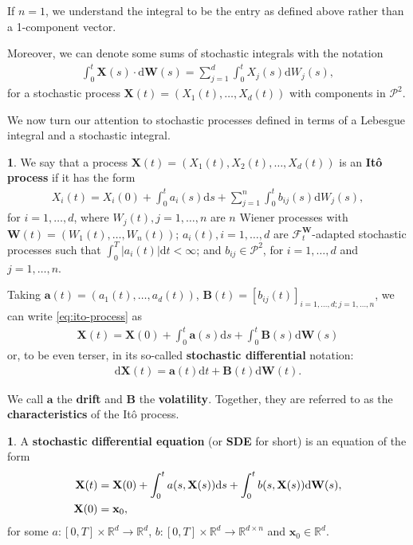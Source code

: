 \documentclass[english]{article}
\numberwithin{equation}{section}
\numberwithin{figure}{section}
\theoremstyle{bolddescit}
\theoremstyle{definition}
\newtheorem{definition}[theorem]{\protect\definitionname}
\theoremstyle{definition}
\theoremstyle{plain}
\theoremstyle{plain}
\theoremstyle{bolddesc}
\theoremstyle{plain}
\theoremstyle{remark}
\providecommand{\definitionname}{Definition}
\begin{document}
If $n=1$, we understand the integral to be the entry as defined above rather than a 1-component vector.

Moreover, we can denote some sums of stochastic integrals with the notation
\begin{align*}
  \int_0^t \mathbf{X}(s) \cdot \mathrm{d}\mathbf{W}(s) = \sum_{j=1}^{d} \int_0^t X_j(s) \mathrm{d}W_j(s),
\end{align*}
for a stochastic process $\mathbf{X}(t) = (X_1(t), \ldots, X_d(t))$ with components in $\mathcal{P}^2$.

We now turn our attention to stochastic processes defined in terms of a Lebesgue integral and a stochastic integral.

\begin{definition}
  We say that a process $\mathbf{X}(t) = (X_1(t), X_2(t), \ldots, X_d(t))$ is an \textbf{It\^o process} if it has the form
  \begin{align}\label{eq:ito-process}
    X_i(t) = X_i(0) + \int_0^t a_i(s) \mathrm{d}s + \sum_{j=1}^n \int_0^t b_{ij}(s) \mathrm{d}W_j(s),
  \end{align}
  for $i=1,\ldots,d$, where $W_j(t), j=1,\ldots,n$ are $n$ Wiener processes with $\mathbf{W}(t) = (W_1(t),\ldots,W_n(t))$; $a_i(t), i=1,\ldots,d$ are $\mathcal{F}^\mathbf{W}_t$-adapted stochastic processes such that $\int_0^T |a_i(t)| \mathrm{d}t < \infty$; and $b_{ij} \in \mathcal{P}^2$, for $i=1,\ldots,d$ and $j=1,\ldots,n$.
\end{definition}

Taking $\mathbf{a}(t) = (a_1(t),\ldots,a_d(t))$, $\mathbf{B}(t) = [b_{ij}(t)]_{i=1,\ldots,d;j=1,\ldots,n}$, we can write \eqref{eq:ito-process} as
\begin{align*}
  \mathbf{X}(t) = \mathbf{X}(0) + \int_0^t \mathbf{a}(s) \mathrm{d}s + \int_0^t \mathbf{B}(s) \mathrm{d}\mathbf{W}(s)
\end{align*}
or, to be even terser, in its so-called \textbf{stochastic differential} notation:
\begin{align*}
  \mathrm{d}\mathbf{X}(t) = \mathbf{a}(t) \mathrm{d}t + \mathbf{B}(t) \mathrm{d}\mathbf{W}(t).
\end{align*}

We call $\mathbf{a}$ the \textbf{drift} and $\mathbf{B}$ the \textbf{volatility}. Together, they are referred to as the \textbf{characteristics} of the It\^o process.

\begin{definition}
  A \textbf{stochastic differential equation} (or \textbf{SDE} for short) is an equation of the form
  \begin{align}\label{eq:sde-init-value}
    \mathbf{X}(t) &= \mathbf{X}(0) + \int_0^t a(s, \mathbf{X}(s)) \mathrm{d}s + \int_0^t b(s, \mathbf{X}(s)) \mathrm{d}\mathbf{W}(s),\\
    \mathbf{X}(0) &= \mathbf{x}_0,\notag
  \end{align}
  for some $a : [0,T] \times \mathbb{R}^{d} \to \mathbb{R}^d$, $b : [0,T] \times \mathbb{R}^{d} \to \mathbb{R}^{d \times n}$ and $\mathbf{x}_0 \in \mathbb{R}^d$.
\end{definition}
\end{document}
